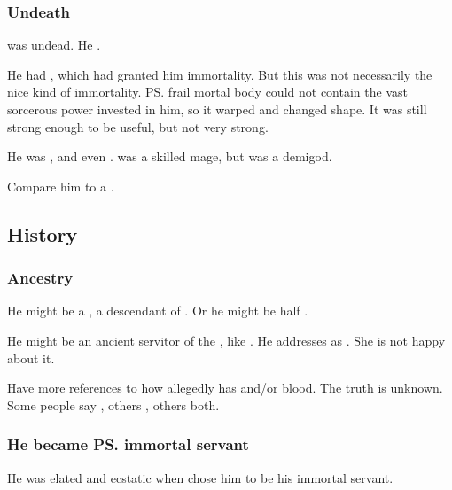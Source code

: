 \subsubsection{Undeath}
\Psyrex was undead.
He . 

He had , which had granted him immortality.
But this was not necessarily the nice kind of immortality. 
\ps{\Psyrex} frail mortal body could not contain the vast sorcerous power invested in him, so it warped and changed shape.
It was still strong enough to be useful, but not very strong.

He was , and even . 
\Criseis was a skilled mage, but \Psyrex was a demigod.

Compare him to a . 









\subsection{History}
\subsubsection{Ancestry}
He might be a \rachyth, a descendant of \Secherdamon. Or he might be half \daemon. 

He might be an ancient servitor of the \dragons{}, like . 
He addresses \Criseis{} as . She is not happy about it. 

Have more references to how \Psyrex{} allegedly has \draconian{} and/or \daemonic{} blood. The truth is unknown. Some people say \draconian, others \daemonic, others both. 





\subsubsection{He became \ps{\Secherdamon} immortal servant}
He was elated and ecstatic when \Secherdamon{} chose him to be his immortal servant. 

